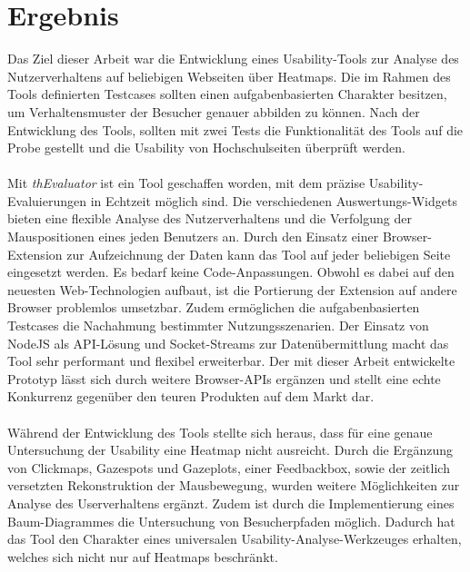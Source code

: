 %
%
%
%

\chapter{Ergebnis}

Das Ziel dieser Arbeit war die Entwicklung eines Usability-Tools zur Analyse des Nutzerverhaltens auf beliebigen Webseiten über Heatmaps. Die im Rahmen des Tools definierten Testcases sollten einen aufgabenbasierten Charakter besitzen, um Verhaltensmuster der Besucher genauer abbilden zu können. Nach der Entwicklung des Tools, sollten mit zwei Tests die Funktionalität des Tools auf die Probe gestellt und die Usability von Hochschulseiten überprüft werden.\\
\\
Mit \textit{thEvaluator} ist ein Tool geschaffen worden, mit dem präzise Usability-Evaluierungen in Echtzeit möglich sind. Die verschiedenen Auswertungs-Widgets bieten eine flexible Analyse des Nutzerverhaltens und die Verfolgung der Mauspositionen eines jeden Benutzers an. Durch den Einsatz einer Browser-Extension zur Aufzeichnung der Daten kann das Tool auf jeder beliebigen Seite eingesetzt werden. Es bedarf keine Code-Anpassungen. Obwohl es dabei auf den neuesten Web-Technologien aufbaut, ist die Portierung der Extension auf andere Browser problemlos umsetzbar. Zudem ermöglichen die aufgabenbasierten Testcases die Nachahmung bestimmter Nutzungsszenarien. Der Einsatz von NodeJS als API-Lösung und Socket-Streams zur Datenübermittlung macht das Tool sehr performant und flexibel erweiterbar. Der mit dieser Arbeit entwickelte Prototyp lässt sich durch weitere Browser-APIs ergänzen und stellt eine echte Konkurrenz gegenüber den teuren Produkten auf dem Markt dar.\\
\\
Während der Entwicklung des Tools stellte sich heraus, dass für eine genaue Untersuchung der Usability eine Heatmap nicht ausreicht. Durch die Ergänzung von Clickmaps, Gazespots und Gazeplots, einer Feedbackbox, sowie der zeitlich versetzten Rekonstruktion der Mausbewegung, wurden weitere Möglichkeiten zur Analyse des Userverhaltens ergänzt. Zudem ist durch die Implementierung eines Baum-Diagrammes die Untersuchung von Besucherpfaden möglich. Dadurch hat das Tool den Charakter eines universalen Usability-Analyse-Werkzeuges erhalten, welches sich nicht nur auf Heatmaps beschränkt.\\
